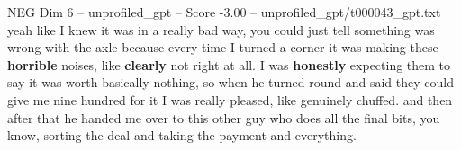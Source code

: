 \begin{textsample}{NEG Dim 6 – unprofiled\_gpt – Score -3.00 – unprofiled\_gpt/t000043\_gpt.txt}  \label{ex:f6_neg_023}
yeah like I knew it was in a really bad way, you could just tell something was wrong with the axle because every time I turned a corner it was making these \textbf{horrible} noises, like \textbf{clearly} not right at all.
I was \textbf{honestly} expecting them to say it was worth basically nothing, so when he turned round and said they could give me nine hundred for it I was really pleased, like genuinely chuffed. and then after that he handed me over to this other guy who does all the final bits, you know, sorting the deal and taking the payment and everything.

\end{textsample}
